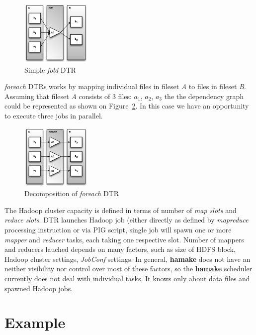 \documentclass[10pt,conference,letterpaper]{IEEEtran}
\begin{document}
\begin{figure}[htp]
\centering
\includegraphics[width=0.3\textwidth]{twofoldp.eps}
\caption{Simple \emph{fold} DTR}
\label{fig:fold2}
\end{figure}

\emph{foreach} DTRs works by mapping individual files in fileset
\textit{A} to files in fileset \textit{B}. Assuming that fileset
\textit{A} consists of 3 files: \textit{$a_1$}, \textit{$a_2$},
\textit{$a_3$} the the dependency graph could be represented as shown
on Figure~\ref{fig:foreach2}. In this case we have an opportunity to
execute three jobs in parallel.

\begin{figure}[htp]
\centering
\includegraphics[width=0.3\textwidth]{twoforeachp.eps}
\caption{Decomposition of \emph{foreach} DTR}
\label{fig:foreach2}
\end{figure}

The Hadoop cluster capacity is defined in terms of number of
\textit{map slots} and \textit{reduce slots}. DTR launches Hadoop job
(either directly as defined by \emph{mapreduce} processing instruction
or via PIG script, single job will spawn one or more \emph{mapper} and
\emph{reducer} tasks, each taking one respective slot. Number of
mappers and reducers lauched depends on many factors, such as size of
HDFS block, Hadoop cluster settings, \emph{JobConf} settings. In
general, \textbf{hamake} does not have an neither visibility nor
control over most of these factors, so the \textbf{hamake} scheduler
currently does not deal with individual tasks. It knows only about
data files and spawned Hadoop jobs.

\section{Example}
\end{document}
